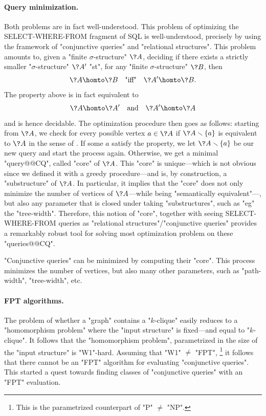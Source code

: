 \paragraph*{Query minimization.}
Both problems are in fact well-understood.
This problem of optimizing the \textsf{SELECT-WHERE-FROM} fragment of
SQL is well-understood, precisely by using the framework of "conjunctive queries"
and "relational structures".
This problem amounts to, given a "finite $\sigma$-structure" $\?A$,
deciding if there exists a strictly smaller "$\sigma$-structure" $\?A'$ "st",
for any "finite $\sigma$-structure" $\?B$, then
\[
	\?A \homto \?B
	\quad\text{"iff"}\quad
	\?A' \homto \?B.
\]
The property above is in fact equivalent to
\begin{equation}
	\?A \homto \?A'
	\quad\text{and}\quad
	\?A' \homto \?A
	\label{eq:intro-hom-equivalence}
\end{equation}
and is hence decidable.
The optimization procedure then goes as follows:
starting from $\?A$, we check for every possible vertex $a \in \?A$
if $\?A \smallsetminus \{a\}$ is equivalent to $\?A$ in the sense of
. If some $a$ satisfy the property, we
let $\?A \smallsetminus \{a\}$ be our new query and start the process again.
Otherwise, we get a minimal "query@@CQ", called "core" of $\?A$.
This "core" is unique---which is not obvious since we defined it with
a greedy procedure---and is, by construction, a "substructure" of $\?A$.
In particular, it implies that the "core" does not only minimize the number of
vertices of $\?A$---while being "semantically equivalent"---, but also any
parameter that is closed under taking "substructures", such as "eg" the "tree-width".
Therefore, this notion of "core", together with seeing
\textsf{SELECT-WHERE-FROM} queries as "relational structures"/"conjunctive queries"
provides a remarkably robust tool for solving most optimization problem on these "queries@@CQ".

\begin{known}
	"Conjunctive queries" can be minimized by computing their "core".
	This process minimizes the number of vertices, but also many other
	parameters, such as "path-width", "tree-width", etc.
\end{known}

\paragraph*{FPT algorithms.}
The problem of whether a "graph" contains a "$k$-clique" easily reduces to a
"homomorphism problem" where the "input structure" is fixed---and equal to "$k$-clique".
It follows that the "homomorphism problem", parametrized in the
size of the "input structure" is "W1"-hard. Assuming that "W1" $\neq$ "FPT",%
\footnote{This is the parametrized counterpart of "P" $\neq$ "NP".}
it follows that there cannot be an "FPT" algorithm for evaluating "conjunctive queries".
This started a quest towards finding classes of "conjunctive queries" with an "FPT" evaluation.

